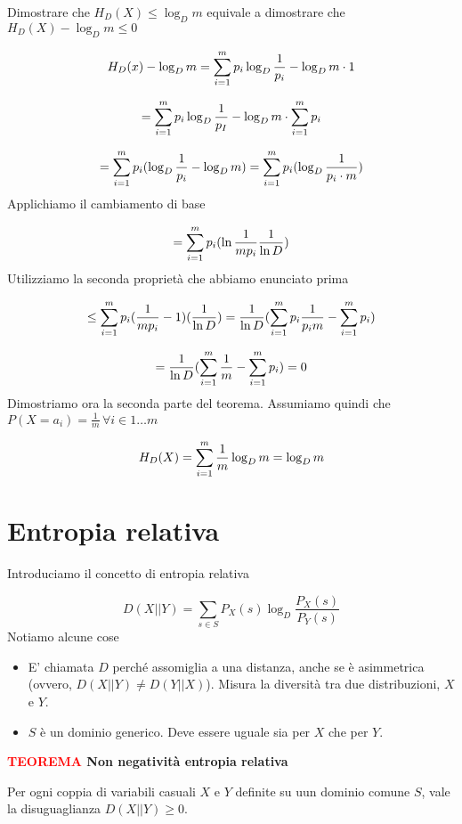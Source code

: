 \documentclass[12pt]{report}
\begin{document}
    \begin{dimo}
        Dimostrare che $H_D(X) \leq \log_D{m}$ equivale a dimostrare che $H_D(X) - \log_D{m} \leq 0$

        $$H_D(x) - \log_D{m} = \sum_{i=1}^{m} p_i \log_D{\frac{1}{p_i}} - \log_D{m} \cdot 1$$

        $$= \sum_{i=1}^{m} p_i \log_D{\frac{1}{p_I}} - \log_D{m} \cdot \sum_{i=1}^{m} p_i$$

        $$= \sum_{i=1}^{m} p_i(\log_D{\frac{1}{p_i}} - \log_D{m}) = \sum_{i=1}^{m} p_i (\log_D{\frac{1}{p_i\cdot m}})$$
        Applichiamo il cambiamento di base

        $$= \sum_{i=1}^{m} p_i (\ln{\frac{1}{m p_i}} \frac{1}{\ln{D}})$$
        Utilizziamo la seconda proprietà che abbiamo enunciato prima

        $$\leq \sum_{i=1}^{m} p_i (\frac{1}{m p_i} - 1)(\frac{1}{\ln{D}}) = \frac{1}{\ln{D}} (\sum_{i=1}^{m} p_i \frac{1}{p_i m} - \sum_{i=1}^{m} p_i)$$

        $$= \frac{1}{\ln{D}} (\sum_{i=1}^{m} \frac{1}{m} - \sum_{i=1}^{m} p_i) = 0$$
        Dimostriamo ora la seconda parte del teorema. Assumiamo quindi che $P(X = a_i)  = \frac{1}{m} \, \forall i \in 1\dots m$

        $$H_D(X) = \sum_{i=1}^{m} \frac{1}{m} \log_D{m} = \log_D{m}$$

    \end{dimo}

    \section{Entropia relativa}

    Introduciamo il concetto di entropia relativa

    $$D(X || Y) = \sum_{s \in S} P_X(s) \log_D{\frac{P_X(s)}{P_Y(s)}}$$
    Notiamo alcune cose

    \begin{itemize}
        \item E' chiamata $D$ perché assomiglia a una distanza, anche se è asimmetrica (ovvero, $D(X || Y) \neq D(Y || X)$). Misura la diversità tra due distribuzioni, $X$ e $Y$.
        \item $S$ è un dominio generico. Deve essere uguale sia per $X$ che per $Y$.
    \end{itemize}


    \vspace{5px}
    \begin{tcolorbox}
        \textbf{\textcolor{red}{TEOREMA} Non negatività entropia relativa}
        \vspace{5px}
        \begin{center}
            Per ogni coppia di variabili casuali $X$ e $Y$ definite su uun dominio comune $S$, vale la disuguaglianza $D(X||Y) \geq 0$.
        \end{center}
    \end{tcolorbox}
\end{document}
